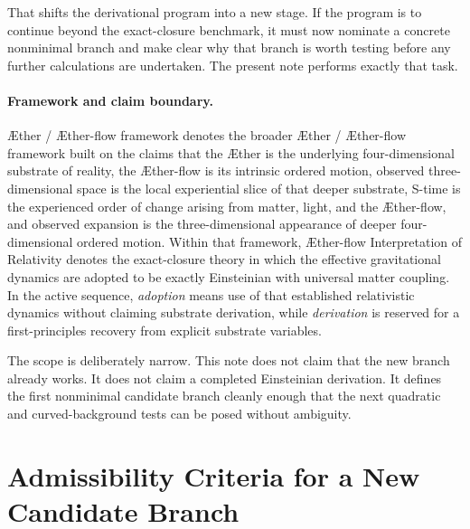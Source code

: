 \documentclass[11pt]{article}
\newcommand{\Aether}{\AE{}ther}
\newcommand{\Aflow}{\AE{}ther-flow}
\newcommand{\TheoryName}{\Aflow{} Interpretation of Relativity}
\newcommand{\TheoryProgram}{\Aether{} / \Aflow{} framework}
\begin{document}
That shifts the derivational program into a new stage. If the program is to continue beyond the exact-closure benchmark, it must now nominate a concrete nonminimal branch and make clear why that branch is worth testing before any further calculations are undertaken. The present note performs exactly that task.

\paragraph{Framework and claim boundary.}
\TheoryProgram{} denotes the broader \Aether{} / \Aflow{} framework built on the claims that the \Aether{} is the underlying four-dimensional substrate of reality, the \Aflow{} is its intrinsic ordered motion, observed three-dimensional space is the local experiential slice of that deeper substrate, S-time is the experienced order of change arising from matter, light, and the \Aflow{}, and observed expansion is the three-dimensional appearance of deeper four-dimensional ordered motion. Within that framework, \TheoryName{} denotes the exact-closure theory in which the effective gravitational dynamics are adopted to be exactly Einsteinian with universal matter coupling. In the active sequence, \emph{adoption} means use of that established relativistic dynamics without claiming substrate derivation, while \emph{derivation} is reserved for a first-principles recovery from explicit substrate variables.

The scope is deliberately narrow. This note does not claim that the new branch already works. It does not claim a completed Einsteinian derivation. It defines the first nonminimal candidate branch cleanly enough that the next quadratic and curved-background tests can be posed without ambiguity.

\section{Admissibility Criteria for a New Candidate Branch}
\end{document}
